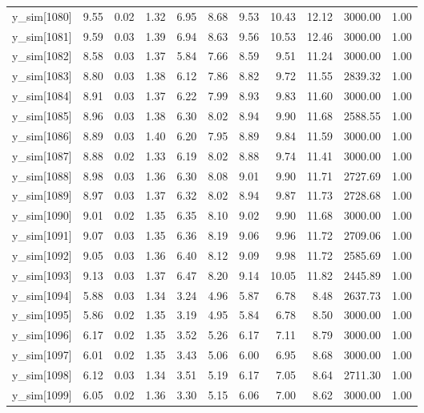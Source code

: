 \begin{table}[ht]
\begin{tabular}{rrrrrrrrrrr}
  y\_sim[1080] & 9.55 & 0.02 & 1.32 & 6.95 & 8.68 & 9.53 & 10.43 & 12.12 & 3000.00 & 1.00 \\ 
  y\_sim[1081] & 9.59 & 0.03 & 1.39 & 6.94 & 8.63 & 9.56 & 10.53 & 12.46 & 3000.00 & 1.00 \\ 
  y\_sim[1082] & 8.58 & 0.03 & 1.37 & 5.84 & 7.66 & 8.59 & 9.51 & 11.24 & 3000.00 & 1.00 \\ 
  y\_sim[1083] & 8.80 & 0.03 & 1.38 & 6.12 & 7.86 & 8.82 & 9.72 & 11.55 & 2839.32 & 1.00 \\ 
  y\_sim[1084] & 8.91 & 0.03 & 1.37 & 6.22 & 7.99 & 8.93 & 9.83 & 11.60 & 3000.00 & 1.00 \\ 
  y\_sim[1085] & 8.96 & 0.03 & 1.38 & 6.30 & 8.02 & 8.94 & 9.90 & 11.68 & 2588.55 & 1.00 \\ 
  y\_sim[1086] & 8.89 & 0.03 & 1.40 & 6.20 & 7.95 & 8.89 & 9.84 & 11.59 & 3000.00 & 1.00 \\ 
  y\_sim[1087] & 8.88 & 0.02 & 1.33 & 6.19 & 8.02 & 8.88 & 9.74 & 11.41 & 3000.00 & 1.00 \\ 
  y\_sim[1088] & 8.98 & 0.03 & 1.36 & 6.30 & 8.08 & 9.01 & 9.90 & 11.71 & 2727.69 & 1.00 \\ 
  y\_sim[1089] & 8.97 & 0.03 & 1.37 & 6.32 & 8.02 & 8.94 & 9.87 & 11.73 & 2728.68 & 1.00 \\ 
  y\_sim[1090] & 9.01 & 0.02 & 1.35 & 6.35 & 8.10 & 9.02 & 9.90 & 11.68 & 3000.00 & 1.00 \\ 
  y\_sim[1091] & 9.07 & 0.03 & 1.35 & 6.36 & 8.19 & 9.06 & 9.96 & 11.72 & 2709.06 & 1.00 \\ 
  y\_sim[1092] & 9.05 & 0.03 & 1.36 & 6.40 & 8.12 & 9.09 & 9.98 & 11.72 & 2585.69 & 1.00 \\ 
  y\_sim[1093] & 9.13 & 0.03 & 1.37 & 6.47 & 8.20 & 9.14 & 10.05 & 11.82 & 2445.89 & 1.00 \\ 
  y\_sim[1094] & 5.88 & 0.03 & 1.34 & 3.24 & 4.96 & 5.87 & 6.78 & 8.48 & 2637.73 & 1.00 \\ 
  y\_sim[1095] & 5.86 & 0.02 & 1.35 & 3.19 & 4.95 & 5.84 & 6.78 & 8.50 & 3000.00 & 1.00 \\ 
  y\_sim[1096] & 6.17 & 0.02 & 1.35 & 3.52 & 5.26 & 6.17 & 7.11 & 8.79 & 3000.00 & 1.00 \\ 
  y\_sim[1097] & 6.01 & 0.02 & 1.35 & 3.43 & 5.06 & 6.00 & 6.95 & 8.68 & 3000.00 & 1.00 \\ 
  y\_sim[1098] & 6.12 & 0.03 & 1.34 & 3.51 & 5.19 & 6.17 & 7.05 & 8.64 & 2711.30 & 1.00 \\ 
  y\_sim[1099] & 6.05 & 0.02 & 1.36 & 3.30 & 5.15 & 6.06 & 7.00 & 8.62 & 3000.00 & 1.00 \\ 

\end{tabular}
\end{table}
